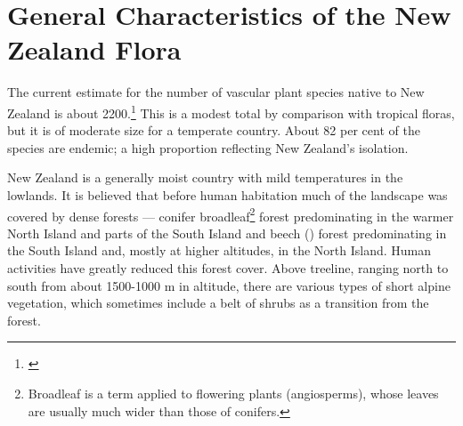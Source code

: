 \chapter{General Characteristics of the New Zealand Flora}

The current estimate for the number of vascular plant species native to New Zealand is about 2200.\footnote{\cite{druce1984indigenous}}
This is a modest total by comparison with tropical floras, but it is of moderate size for a temperate country.
About 82 per cent of the species are endemic; a high proportion reflecting New Zealand's isolation.

New Zealand is a generally moist country with mild temperatures in the lowlands.
It is believed that before human habitation much of the landscape was covered by dense forests — conifer broadleaf\footnote{Broadleaf is a term applied to flowering plants (angiosperms), whose leaves are usually much wider than those of conifers.} forest predominating in the warmer North Island and parts of the South Island and beech () forest predominating in the South Island and, mostly at higher altitudes, in the North Island.
Human activities have greatly reduced this forest cover.
Above treeline, ranging north to south from about 1500-1000 m in altitude, there are various types of short alpine vegetation, which sometimes include a belt of shrubs as a transition from the forest.


